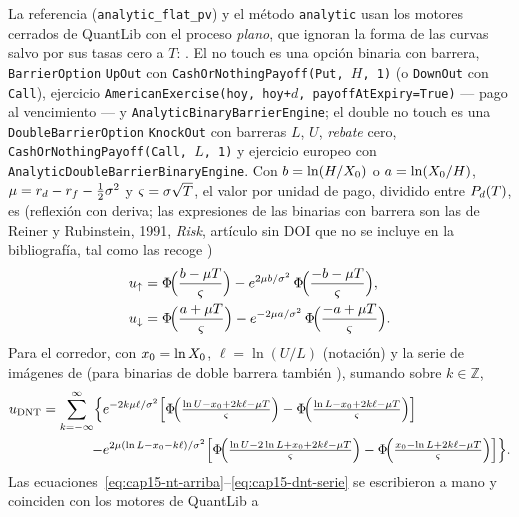 La referencia (\texttt{analytic\_flat\_pv}) y el método \texttt{analytic} usan los motores cerrados de QuantLib con el proceso
\emph{plano}, que ignoran la forma de las curvas salvo por sus tasas cero a $T$:
. El no touch es una opción binaria con barrera,
\texttt{BarrierOption} \texttt{UpOut} con \texttt{CashOrNothingPayoff(Put, $H$, 1)} (o \texttt{DownOut} con
\texttt{Call}), ejercicio \texttt{AmericanExercise(hoy, hoy+$d$, payoffAtExpiry=True)} --- pago al vencimiento --- y
\texttt{AnalyticBinaryBarrierEngine}; el double no touch es una \texttt{DoubleBarrierOption} \texttt{KnockOut} con barreras $L$, $U$,
\emph{rebate} cero, \texttt{CashOrNothingPayoff(Call, $L$, 1)} y ejercicio europeo con
\texttt{AnalyticDoubleBarrierBinaryEngine}. Con $b=\ln(H/X_0)$ o $a=\ln(X_0/H)$, $\mu=r_d-r_f-\tfrac12\sigma^2$ y
$\varsigma=\sigma\sqrt T$, el valor por unidad de pago, dividido entre $P_{d}(T)$, es (reflexión con deriva; las expresiones de las binarias con
barrera son las de Reiner y Rubinstein, 1991, \emph{Risk}, artículo sin DOI que no se incluye en la bibliografía, tal como las recoge \citealt{haug2007})
\begin{align}
  u_{\uparrow}&=\Phi\!\Bigl(\frac{b-\mu T}{\varsigma}\Bigr)-e^{2\mu b/\sigma^2}\,\Phi\!\Bigl(\frac{-b-\mu T}{\varsigma}\Bigr),\label{eq:cap15-nt-arriba}\\
  u_{\downarrow}&=\Phi\!\Bigl(\frac{a+\mu T}{\varsigma}\Bigr)-e^{-2\mu a/\sigma^2}\,\Phi\!\Bigl(\frac{-a+\mu T}{\varsigma}\Bigr).\label{eq:cap15-nt-abajo}
\end{align}
Para el corredor, con $x_0=\ln X_0$, $\ell=\ln(U/L)$ (notación) y la serie de imágenes de \citet{kunitomo1992} (para binarias de doble barrera también
\citealt{hui1996}), sumando sobre $k\in\mathbb Z$,
\begin{equation}\label{eq:cap15-dnt-serie}
  \begin{aligned}
  u_{\mathrm{DNT}}=\sum_{k=-\infty}^{\infty}\Bigl\{&e^{-2k\mu\ell/\sigma^2}\Bigl[\Phi\!\Bigl(\tfrac{\ln U-x_0+2k\ell-\mu T}{\varsigma}\Bigr)-\Phi\!\Bigl(\tfrac{\ln L-x_0+2k\ell-\mu T}{\varsigma}\Bigr)\Bigr]\\
  -&e^{2\mu(\ln L-x_0-k\ell)/\sigma^2}\Bigl[\Phi\!\Bigl(\tfrac{\ln U-2\ln L+x_0+2k\ell-\mu T}{\varsigma}\Bigr)-\Phi\!\Bigl(\tfrac{x_0-\ln L+2k\ell-\mu T}{\varsigma}\Bigr)\Bigr]\Bigr\}.
  \end{aligned}
\end{equation}
Las ecuaciones~\eqref{eq:cap15-nt-arriba}--\eqref{eq:cap15-dnt-serie} se escribieron a mano y coinciden con los motores de QuantLib a
